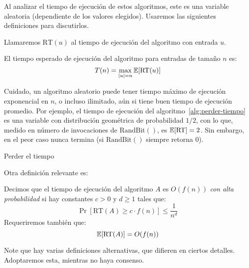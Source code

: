    Al analizar el tiempo de ejecución de estos algoritmos,
   este es una variable aleatoria
   (dependiente de los valores elegidos).
   Usaremos las siguientes definiciones para discutirlos.
   \begin{definition}
     \label{def:RT}
     Llamaremos \(\mathrm{RT}(u)\) al tiempo de ejecución del algoritmo
     con entrada \(u\).
   \end{definition}
   \begin{definition}
     \label{def:T-aleatorizado}
     El tiempo esperado de ejecución del algoritmo
     para entradas de tamaño \(n\) es:
     \begin{equation*}
       T(n)
         = \max_{\lvert u \rvert = n} \operatorname{\mathbb{E}}[ \mathrm{RT}(u) ]
     \end{equation*}
   \end{definition}
   Cuidado,
   un algoritmo aleatorio puede tener tiempo máximo de ejecución
   exponencial en \(n\),
   o incluso ilimitado,
   aún si tiene buen tiempo de ejecución promedio.
   Por ejemplo,
   el tiempo de ejecución del algoritmo~\ref{alg:perder-tiempo}
   es una variable con distribución geométrica de probabilidad \(1/2\),
   con lo que,
   medido en número de invocaciones de \(\mathrm{RandBit}()\),
   es \(\operatorname{\mathbb{E}}[\mathrm{RT}] = 2\).
   Sin embargo,
   en el peor caso nunca termina
   (si \(\mathrm{RandBit}()\) siempre retorna \num{0}).
   \begin{algorithm}[ht]
     \DontPrintSemicolon\Indp

     \caption{Perder el tiempo}
     \label{alg:perder-tiempo}
   \end{algorithm}

   Otra definición relevante es:
   \begin{definition}
     \label{def:high-probability}
     Decimos que el tiempo de ejecución del algoritmo \(A\)
     es \(O(f(n))\) \emph{con alta probabilidad}
     si hay constantes \(c > 0\) y \(d \ge 1\) tales que:
     \begin{equation*}
       \Pr[ \mathrm{RT}(A) \ge c \cdot f(n) ]
         \le \frac{1}{n^d}
     \end{equation*}
     Requeriremos también que:
     \begin{equation*}
       \operatorname{\mathbb{E}}[ \mathrm{RT}(A) ]
         = O(f(n))
     \end{equation*}
   \end{definition}
   Note que hay varias definiciones alternativas,
   que difieren en ciertos detalles.
   Adoptaremos esta,
   mientras no haya consenso.

